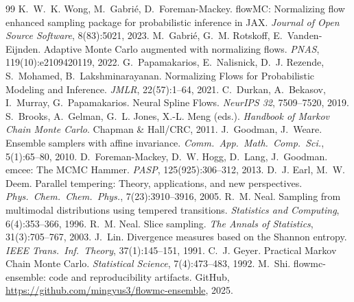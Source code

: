 \documentclass[11pt]{article}
\begin{document}
\begin{thebibliography}{99}
 K.~W.~K. Wong, M.~Gabri\'e, D.~Foreman-Mackey. flowMC:
Normalizing flow enhanced sampling package for probabilistic inference in JAX.
\textit{Journal of Open Source Software}, 8(83):5021, 2023.
 M.~Gabri\'e, G.~M. Rotskoff, E.~Vanden-Eijnden. Adaptive
Monte Carlo augmented with normalizing flows. \textit{PNAS},
119(10):e2109420119, 2022.
 G.~Papamakarios, E.~Nalisnick, D.~J. Rezende,
S.~Mohamed, B.~Lakshminarayanan. Normalizing Flows for Probabilistic Modeling
and Inference. \textit{JMLR}, 22(57):1--64, 2021.
 C.~Durkan, A.~Bekasov, I.~Murray, G.~Papamakarios. Neural
Spline Flows. \textit{NeurIPS 32}, 7509--7520, 2019.
 S.~Brooks, A.~Gelman, G.~L. Jones, X.-L. Meng (eds.).
\textit{Handbook of Markov Chain Monte Carlo}. Chapman \& Hall/CRC, 2011.
 J.~Goodman, J.~Weare. Ensemble samplers with affine
invariance. \textit{Comm.\ App.\ Math.\ Comp.\ Sci.}, 5(1):65--80, 2010.
 D.~Foreman-Mackey, D.~W. Hogg, D.~Lang, J.~Goodman. emcee:
The MCMC Hammer. \textit{PASP}, 125(925):306--312, 2013.
 D.~J. Earl, M.~W. Deem. Parallel tempering: Theory,
applications, and new perspectives. \textit{Phys.\ Chem.\ Chem.\ Phys.},
7(23):3910--3916, 2005.
 R.~M. Neal. Sampling from multimodal distributions using
tempered transitions. \textit{Statistics and Computing}, 6(4):353--366, 1996.
 R.~M. Neal. Slice sampling. \textit{The Annals of
Statistics}, 31(3):705--767, 2003.
 J.~Lin. Divergence measures based on the Shannon entropy.
\textit{IEEE Trans.\ Inf.\ Theory}, 37(1):145--151, 1991.
 C.~J. Geyer. Practical Markov Chain Monte Carlo.
\textit{Statistical Science}, 7(4):473--483, 1992.
 M.~Shi. flowmc-ensemble: code and reproducibility artifacts.
GitHub, \url{https://github.com/mingyus3/flowmc-ensemble}, 2025.
\end{thebibliography}
\end{document}
